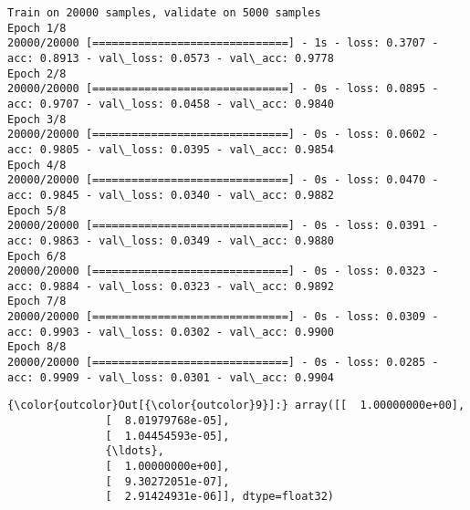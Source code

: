 \documentclass[11pt]{article}
\begin{document}
    \begin{Verbatim}[commandchars=\\\{\}]
Train on 20000 samples, validate on 5000 samples
Epoch 1/8
20000/20000 [==============================] - 1s - loss: 0.3707 - acc: 0.8913 - val\_loss: 0.0573 - val\_acc: 0.9778
Epoch 2/8
20000/20000 [==============================] - 0s - loss: 0.0895 - acc: 0.9707 - val\_loss: 0.0458 - val\_acc: 0.9840
Epoch 3/8
20000/20000 [==============================] - 0s - loss: 0.0602 - acc: 0.9805 - val\_loss: 0.0395 - val\_acc: 0.9854
Epoch 4/8
20000/20000 [==============================] - 0s - loss: 0.0470 - acc: 0.9845 - val\_loss: 0.0340 - val\_acc: 0.9882
Epoch 5/8
20000/20000 [==============================] - 0s - loss: 0.0391 - acc: 0.9863 - val\_loss: 0.0349 - val\_acc: 0.9880
Epoch 6/8
20000/20000 [==============================] - 0s - loss: 0.0323 - acc: 0.9884 - val\_loss: 0.0323 - val\_acc: 0.9892
Epoch 7/8
20000/20000 [==============================] - 0s - loss: 0.0309 - acc: 0.9903 - val\_loss: 0.0302 - val\_acc: 0.9900
Epoch 8/8
20000/20000 [==============================] - 0s - loss: 0.0285 - acc: 0.9909 - val\_loss: 0.0301 - val\_acc: 0.9904

    \end{Verbatim}

\begin{Verbatim}[commandchars=\\\{\}]
{\color{outcolor}Out[{\color{outcolor}9}]:} array([[  1.00000000e+00],
               [  8.01979768e-05],
               [  1.04454593e-05],
               {\ldots}, 
               [  1.00000000e+00],
               [  9.30272051e-07],
               [  2.91424931e-06]], dtype=float32)
\end{Verbatim}
            
\end{document}
